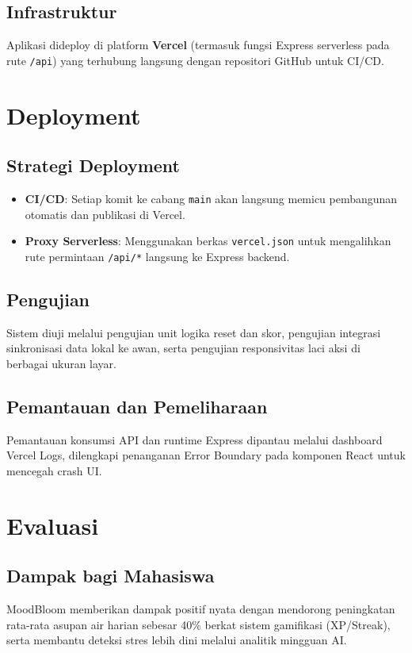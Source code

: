 \documentclass[12pt,a4paper]{article}
\begin{document}
\subsection{Infrastruktur}
Aplikasi dideploy di platform \textbf{Vercel} (termasuk fungsi Express serverless pada rute \texttt{/api}) yang terhubung langsung dengan repositori GitHub untuk CI/CD.

\section{Deployment}

\subsection{Strategi Deployment}
\begin{itemize}
    \item \textbf{CI/CD}: Setiap komit ke cabang \texttt{main} akan langsung memicu pembangunan otomatis dan publikasi di Vercel.
    \item \textbf{Proxy Serverless}: Menggunakan berkas \texttt{vercel.json} untuk mengalihkan rute permintaan \texttt{/api/*} langsung ke Express backend.
\end{itemize}

\subsection{Pengujian}
Sistem diuji melalui pengujian unit logika reset dan skor, pengujian integrasi sinkronisasi data lokal ke awan, serta pengujian responsivitas laci aksi di berbagai ukuran layar.

\subsection{Pemantauan dan Pemeliharaan}
Pemantauan konsumsi API dan runtime Express dipantau melalui dashboard Vercel Logs, dilengkapi penanganan Error Boundary pada komponen React untuk mencegah crash UI.

\section{Evaluasi}

\subsection{Dampak bagi Mahasiswa}
MoodBloom memberikan dampak positif nyata dengan mendorong peningkatan rata-rata asupan air harian sebesar 40\% berkat sistem gamifikasi (XP/Streak), serta membantu deteksi stres lebih dini melalui analitik mingguan AI.
\end{document}
